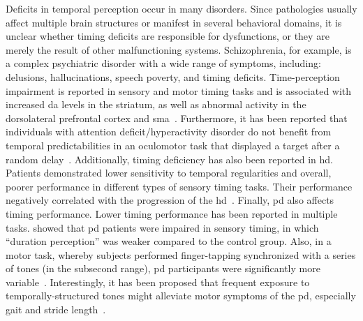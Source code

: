 \par
Deficits in temporal perception occur in many disorders.
Since pathologies usually affect multiple brain structures or manifest in several behavioral domains, it is unclear whether timing deficits are responsible for dysfunctions, or they are merely the result of other malfunctioning systems.
Schizophrenia, for example, is a complex psychiatric disorder with a wide range of symptoms, including: delusions, hallucinations, speech poverty, and timing deficits.
Time-perception impairment is reported in sensory and motor timing tasks and is associated with increased \gls{da} levels in the striatum, as well as abnormal activity in the dorsolateral prefrontal cortex and \gls{sma}~\cite[see][]{Snowden2019}.
Furthermore, it has been reported that individuals with attention deficit/hyperactivity disorder do not benefit from temporal predictabilities in an oculomotor task that displayed a target after a random delay~\cite{Dankner2017}.
Additionally, timing deficiency has also been reported in \gls{hd}.
Patients demonstrated lower sensitivity to temporal regularities and overall, poorer performance in different types of sensory timing tasks.
Their performance negatively correlated with the progression of the \gls{hd}~\cite{Cope2014}.
Finally, \gls{pd} also affects timing performance.
Lower timing performance has been reported in multiple tasks.
 showed that \gls{pd} patients were impaired in sensory timing, in which ``duration perception'' was weaker compared to the control group.
Also, in a motor task, whereby subjects performed finger-tapping synchronized with a series of tones (in the subsecond range), \gls{pd} participants were significantly more variable~\cite{Harrington1998}.
Interestingly, it has been proposed that frequent exposure to temporally-structured tones might alleviate motor symptoms of the \gls{pd}, especially gait and stride length~\cite{Dalla2017}.

